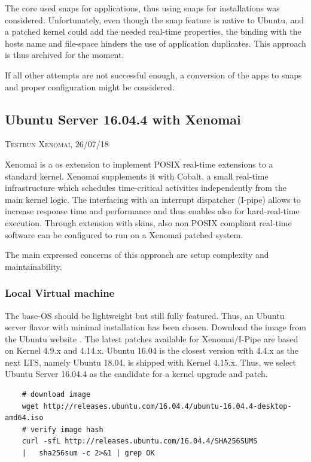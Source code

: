 \documentclass[]{scrartcl}
\begin{document}
The core used snaps for applications, thus using snaps for installations was considered. Unfortunately, even though the snap feature is native to Ubuntu, and a patched kernel could add the needed real-time properties, the binding with the hosts name and file-space hinders the use of application duplicates. This approach is thus archived for the moment.

If all other attempts are not successful enough, a conversion of the apps to snaps and proper configuration might be considered.

\subsection{Ubuntu Server 16.04.4 with Xenomai}

{\small\textsc{Testrun Xenomai, 26/07/18} \bigskip}

Xenomai is a os extension to implement POSIX real-time extensions to a standard kernel. Xenomai supplements it with Cobalt, a small real-time infrastructure which schedules time-critical activities independently from the main kernel logic. The interfacing with an interrupt dispatcher (I-pipe) allows to increase response time and performance and thus enables also for hard-real-time execution. Through extension with skins, also non POSIX compliant real-time software can be configured to run on a Xenomai patched system.

The main expressed concerns of this approach are setup complexity and maintainability.

\subsubsection{Local Virtual machine}
\label{sec:xenoinst}

The base-OS should be lightweight but still fully featured. Thus, an Ubuntu server flavor with minimal installation has been chosen. Download the image from the Ubuntu website \cite{ubuntu02}. The latest patches available for Xenomai/I-Pipe are based on Kernel 4.9.x and 4.14.x. Ubuntu 16.04 is the closest version with 4.4.x as the next LTS, namely Ubuntu 18.04, is shipped with Kernel 4.15.x. Thus, we select Ubuntu Server 16.04.4 as the candidate for a kernel upgrade and patch.

\begin{verbatim}
	# download image
	wget http://releases.ubuntu.com/16.04.4/ubuntu-16.04.4-desktop-amd64.iso
	# verify image hash
	curl -sfL http://releases.ubuntu.com/16.04.4/SHA256SUMS
	|	sha256sum -c 2>&1 | grep OK
\end{verbatim}
\end{document}
